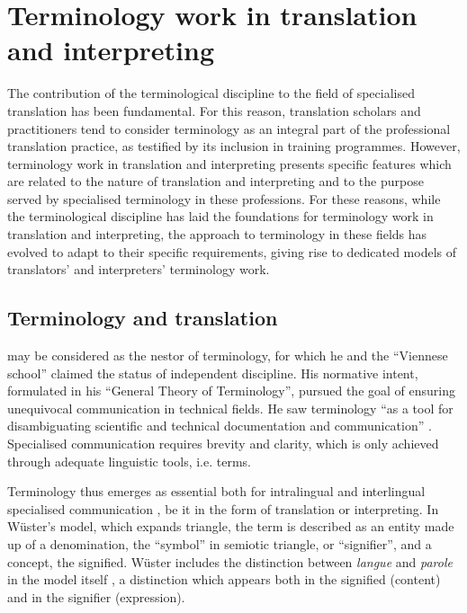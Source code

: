 \section{Terminology work in translation and interpreting} \label{terminology}
The contribution of the terminological discipline to the field of specialised translation has been fundamental. For this reason, translation scholars and practitioners tend to consider terminology as an integral part of the professional translation practice, as testified by its inclusion in training programmes. However, terminology work in translation and interpreting presents specific features which are related to the nature of translation and interpreting and to the purpose served by specialised terminology in these professions. For these reasons, while the terminological discipline has laid the foundations for terminology work in translation and interpreting, the approach to terminology in these fields has evolved to adapt to their specific requirements, giving rise to dedicated models of translators' and interpreters' terminology work.


\subsection{Terminology and translation} \label{terminology_translation}
\citet{wuster_internationale_1931,wuster_einfuhrung_1979} may be considered as the nestor of terminology, for which he and the ``Viennese school'' \citep{drewer_terminologie_2019} claimed the status of independent discipline. His normative intent, formulated in his ``General Theory of Terminology'', pursued the goal of ensuring unequivocal communication in technical fields. He saw terminology ``as a tool for disambiguating scientific and technical documentation and communication'' \citep[17]{cabre_castellvi_we_1998}. Specialised communication requires brevity and clarity, which is only achieved through adequate linguistic tools, i.e. terms.

Terminology thus emerges as essential both for intralingual and interlingual specialised communication \citep{arntz_einfuhrung_1982}, be it in the form of translation or interpreting. In Wüster's model, which expands  triangle, the term is described as an entity made up of a denomination, the ``symbol'' in  semiotic triangle, or  ``signifier'', and a concept, the signified. Wüster includes the distinction between \textit{langue} and \textit{parole} in the model itself \citep[163]{mikkelsen_arntz_1991}, a distinction which appears both in the signified (content) and in the signifier (expression).

